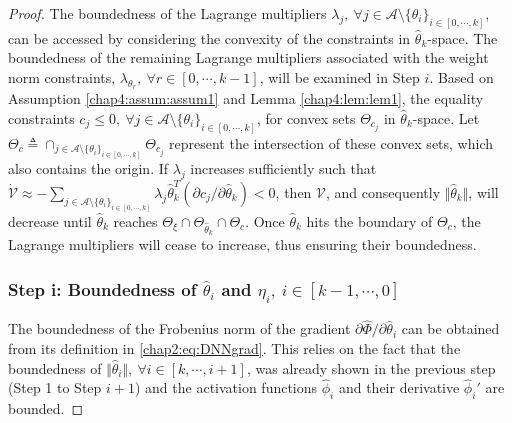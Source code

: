 \begin{proof}
The boundedness of the Lagrange multipliers $\lambda_j,\ \forall j\in\mathcal A\setminus\{\theta_i\}_{i\in[0,\cdots,k]}$, can be accessed by considering the convexity of the constraints in $\hat\theta_k$-space.
The boundedness of the remaining Lagrange multipliers associated with the weight norm constraints, $\lambda_{\theta_r},\ \forall r\in[0,\cdots,k-1]$, will be examined in Step $i$. 
Based on Assumption \ref{chap4:assum:assum1} and Lemma \ref{chap4:lem:lem1}, the equality constraints $c_j \le 0, \ \forall j\in\mathcal A\setminus \{\theta_i\}_{i\in[0,\cdots,k]}$, for convex sets $\Theta_{c_j}$ in $\hat\theta_k$-space.
Let $\Theta_c\triangleq \cap_{j\in\mathcal A\setminus \{\theta_i\}_{i\in[0,\cdots ,k]}} \Theta_{c_j}$ represent the intersection of these convex sets, which also contains the origin.
If $\lambda_j$ increases sufficiently such that $\dot{\mathcal V} \approx -\sum_{j\in\mathcal A\setminus \{\theta_i\}_{i\in[0,\cdots,k]}}\lambda_j\hat\theta_k^T(\partial c_j/\partial \hat\theta_k)<0$, then ${\mathcal V}$, and consequently $\Vert\hat\theta_k\Vert$, will decrease until $\hat\theta_k$ reaches $\Theta_\xi\cap\Theta_{\hat\theta_k}\cap\Theta_c$. Once $\hat\theta_k$ hits the boundary of $\Theta_c$, the Lagrange multipliers will cease to increase, thus ensuring their boundedness.

\subsubsection{Step i: Boundedness of $\hat\theta_i$ and $\eta_i, \ i\in[k-1,\cdots,0]$}

The boundedness of the Frobenius norm of the gradient $\partial\hat\Phi/\partial \hat\theta_i$ can be obtained from its definition in \eqref{chap2:eq:DNNgrad}. 
This relies on the fact that the boundedness of $\Vert\hat\theta_i\Vert,\ \forall i\in[k,\cdots,i+1]$, was already shown in the previous step (\ie Step 1 to Step $i+1$) and the activation functions $\hat\phi_i$ and their derivative $\hat\phi_i'$ are bounded.


\end{proof}
